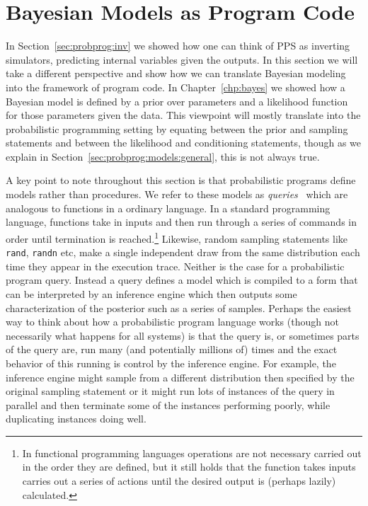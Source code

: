 
\section{Bayesian Models as Program Code}
\label{sec:probprog:models}

In Section~\ref{sec:probprog:inv} we showed how one can think of PPS as inverting simulators, 
predicting internal variables given the outputs.  In this section we will take a 
different perspective and
show how we can translate Bayesian modeling into the framework of program code.   
In Chapter~\ref{chp:bayes} we showed how a Bayesian model is defined by a prior over
parameters and a likelihood function for those parameters given the data.  This viewpoint will
mostly translate into the probabilistic programming setting by equating between the prior
and sampling statements and between the likelihood and conditioning statements, though as
we explain in Section~\ref{sec:probprog:models:general}, this is not always true.

A key point to note throughout this section is that probabilistic programs define
models rather than procedures.  We refer to these models as \emph{queries}~\citep{goodman2008church} 
which are analogous to functions in a ordinary language.
In a standard programming language, functions take in inputs
and then run through a series of commands in order until termination is reached.\footnote{In functional
	programming languages operations are not necessary carried out in the order they are defined,
	but it still holds that the function takes inputs carries out a series of actions until the desired output
	is (perhaps lazily) calculated.}  Likewise, random sampling statements like \texttt{rand}, \texttt{randn}
etc, make a single independent draw from the same distribution each time they appear in the execution trace.
Neither is the case for a probabilistic program query.  Instead a  query defines a model
which is compiled to a form that can be interpreted by an inference engine which then
outputs some characterization of the posterior such as a series of samples.  Perhaps the easiest way to think
about how a probabilistic program language works (though not necessarily what happens for all systems) is that
the query is, or sometimes parts of the query are, run many (and potentially millions of) times and the exact behavior
of this running is control by the inference engine.  For example, the inference engine 
might sample from a different distribution then specified by the original sampling statement or it
might run lots of instances of the query in parallel and then terminate some of the instances
performing poorly, while duplicating instances doing well.

